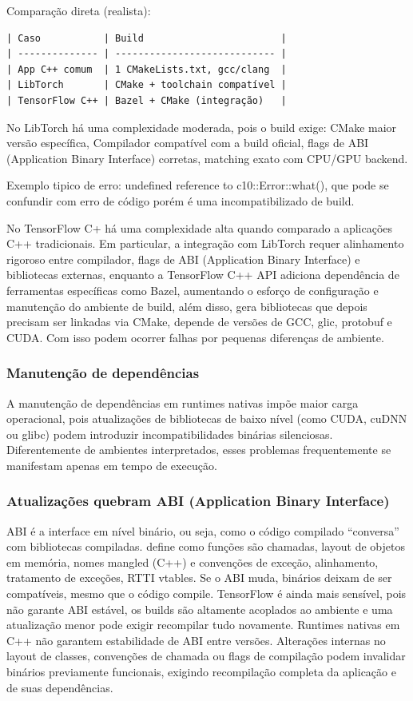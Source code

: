 Comparação direta (realista):
\begin{verbatim}
| Caso           | Build                        |
| -------------- | ---------------------------- |
| App C++ comum  | 1 CMakeLists.txt, gcc/clang  |
| LibTorch       | CMake + toolchain compatível |
| TensorFlow C++ | Bazel + CMake (integração)   |
\end{verbatim}

No LibTorch há uma complexidade moderada, pois o build exige: CMake maior versão específica, Compilador compatível com a build oficial, flags de ABI (Application Binary Interface) corretas, matching exato com CPU/GPU backend.

Exemplo tipico de erro: undefined reference to c10::Error::what(), que pode se confundir com erro de código porém é uma incompatibilizado de build.

No TensorFlow C+ há uma complexidade alta quando comparado a aplicações C++ tradicionais. Em particular, a integração com LibTorch requer alinhamento rigoroso entre compilador, flags de ABI (Application Binary Interface) e bibliotecas externas, enquanto a TensorFlow C++ API adiciona dependência de ferramentas específicas como Bazel, aumentando o esforço de configuração e manutenção do ambiente de build, além disso, gera bibliotecas que depois precisam ser linkadas via CMake, depende de versões de GCC, glic, protobuf e CUDA. Com isso podem ocorrer falhas por pequenas diferenças de ambiente.

\subsubsection{Manutenção de dependências}
A manutenção de dependências em runtimes nativas impõe maior carga operacional, pois atualizações de bibliotecas de baixo nível (como CUDA, cuDNN ou glibc) podem introduzir incompatibilidades binárias silenciosas. Diferentemente de ambientes interpretados, esses problemas frequentemente se manifestam apenas em tempo de execução.

\subsubsection{Atualizações quebram ABI (Application Binary Interface)}
ABI é a interface em nível binário, ou seja, como o código compilado “conversa” com bibliotecas compiladas. define como funções são chamadas, layout de objetos em memória, nomes mangled (C++) e convenções de exceção, alinhamento, tratamento de exceções, RTTI vtables. Se o ABI muda, binários deixam de ser compatíveis, mesmo que o código compile. TensorFlow é ainda mais sensível, pois não garante ABI estável, os builds são altamente acoplados ao ambiente e uma atualização menor pode exigir recompilar tudo novamente.
Runtimes nativas em C++ não garantem estabilidade de ABI entre versões. Alterações internas no layout de classes, convenções de chamada ou flags de compilação podem invalidar binários previamente funcionais, exigindo recompilação completa da aplicação e de suas dependências.

